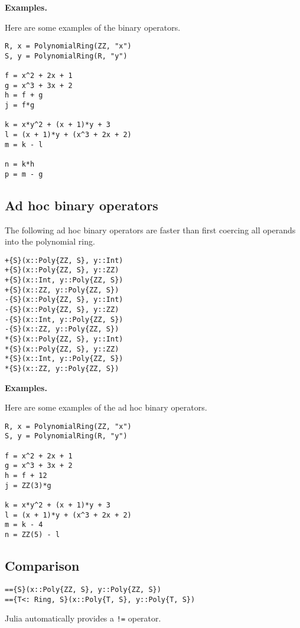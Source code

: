 \documentclass[a4paper,10pt]{article}
\newcommand{\code}{\lstinline}
\begin{document}
{{{{{{\textbf{Examples.}

Here are some examples of the binary operators.

\begin{lstlisting}
R, x = PolynomialRing(ZZ, "x")
S, y = PolynomialRing(R, "y")

f = x^2 + 2x + 1
g = x^3 + 3x + 2
h = f + g
j = f*g

k = x*y^2 + (x + 1)*y + 3
l = (x + 1)*y + (x^3 + 2x + 2)
m = k - l

n = k*h
p = m - g
\end{lstlisting}

\subsection{Ad hoc binary operators}

The following ad hoc binary operators are faster than first coercing all
operands into the polynomial ring.

\begin{lstlisting}
+{S}(x::Poly{ZZ, S}, y::Int)
+{S}(x::Poly{ZZ, S}, y::ZZ)
+{S}(x::Int, y::Poly{ZZ, S})
+{S}(x::ZZ, y::Poly{ZZ, S})
-{S}(x::Poly{ZZ, S}, y::Int)
-{S}(x::Poly{ZZ, S}, y::ZZ)
-{S}(x::Int, y::Poly{ZZ, S})
-{S}(x::ZZ, y::Poly{ZZ, S})
*{S}(x::Poly{ZZ, S}, y::Int)
*{S}(x::Poly{ZZ, S}, y::ZZ)
*{S}(x::Int, y::Poly{ZZ, S})
*{S}(x::ZZ, y::Poly{ZZ, S})
\end{lstlisting}

\textbf{Examples.}

Here are some examples of the ad hoc binary operators.

\begin{lstlisting}
R, x = PolynomialRing(ZZ, "x")
S, y = PolynomialRing(R, "y")

f = x^2 + 2x + 1
g = x^3 + 3x + 2
h = f + 12
j = ZZ(3)*g

k = x*y^2 + (x + 1)*y + 3
l = (x + 1)*y + (x^3 + 2x + 2)
m = k - 4
n = ZZ(5) - l
\end{lstlisting}

\subsection{Comparison}

\begin{lstlisting}
=={S}(x::Poly{ZZ, S}, y::Poly{ZZ, S})
=={T<: Ring, S}(x::Poly{T, S}, y::Poly{T, S})
\end{lstlisting}

Julia automatically provides a \code{!=} operator.

}}}}}}
\end{document}
